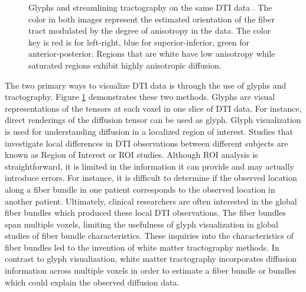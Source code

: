 \begin{figure}
	\caption{Glyphs and streamlining tractography on the same DTI data \cite{KindlmannTVCG2006}. The color in both images represent the estimated orientation of the fiber tract modulated by the degree of anisotropy in the data.  The color key is red is for left-right, blue for superior-inferior, green for anterior-posterior.  Regions that are white have low anisotropy while saturated regions exhibit highly anisotropic diffusion.}
  \label{fig:visualization}
\end{figure}

The two primary ways to visualize DTI data is through the use of glyphs and tractography.  Figure \ref{fig:visualization} demonstrates these two methods.  Glyphs are visual representations of the tensors at each voxel in one slice of DTI data.  For instance, direct renderings of the diffusion tensor can be used as glyph.  Glyph visualization is used for understanding diffusion in a localized region of interest.  Studies that investigate local differences in DTI observations between different subjects are known as Region of Interest or ROI studies. Although ROI analysis is straightforward, it is limited in the information it can provide and may actually introduce errors.  For instance, it is difficult to determine if the observed location along a fiber bundle in one patient corresponds to the observed location in another patient.  Ultimately, clinical researchers are often interested in the global fiber bundles which produced these local DTI observations.  The fiber bundles span multiple voxels, limiting the usefulness of glyph visualization in global studies of fiber bundle characteristics.  These inquiries into the characteristics of fiber bundles led to the invention of white matter tractography methods.  In contrast to glyph visualization, white matter tractography incorporates diffusion information across multiple voxels in order to estimate a fiber bundle or bundles which could explain the observed diffusion data.

